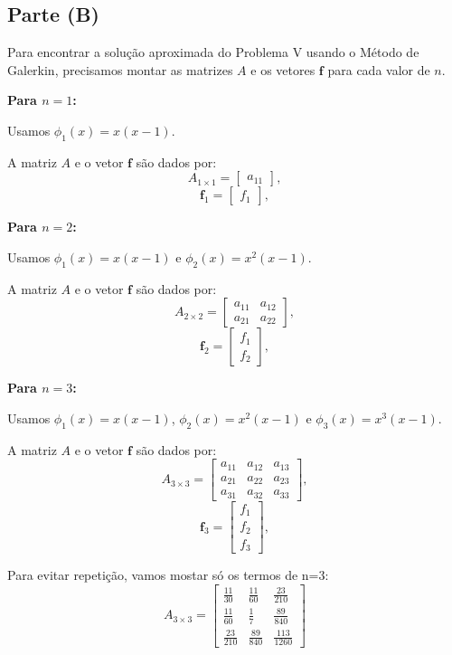 \documentclass{article}
\begin{document}
\subsection{Parte (B)}
Para encontrar a solução aproximada do Problema V usando o Método de Galerkin, precisamos montar as matrizes \( A \) e os vetores \( \mathbf{f} \) para cada valor de \( n \).

\textbf{Para \( n = 1 \):}

Usamos \( \phi_1(x) = x (x - 1) \).

A matriz \( A \) e o vetor \( \mathbf{f} \) são dados por:
\[
A_{1 \times 1} = \begin{bmatrix}
a_{11}
\end{bmatrix},
\]
\[
\mathbf{f}_{1} = \begin{bmatrix}
f_1
\end{bmatrix},
\]


\textbf{Para \( n = 2 \):}

Usamos \( \phi_1(x) = x (x - 1) \) e \( \phi_2(x) = x^2 (x - 1) \).

A matriz \( A \) e o vetor \( \mathbf{f} \) são dados por:
\[
A_{2 \times 2} = \begin{bmatrix}
a_{11} & a_{12} \\
a_{21} & a_{22}
\end{bmatrix},
\]
\[
\mathbf{f}_{2} = \begin{bmatrix}
f_1 \\
f_2
\end{bmatrix},
\]


\textbf{Para \( n = 3 \):}

Usamos \( \phi_1(x) = x (x - 1) \), \( \phi_2(x) = x^2 (x - 1) \) e \( \phi_3(x) = x^3 (x - 1) \).

A matriz \( A \) e o vetor \( \mathbf{f} \) são dados por:
\[
A_{3 \times 3} = \begin{bmatrix}
a_{11} & a_{12} & a_{13} \\
a_{21} & a_{22} & a_{23} \\
a_{31} & a_{32} & a_{33}
\end{bmatrix},
\]
\[
\mathbf{f}_{3} = \begin{bmatrix}
f_1 \\
f_2 \\
f_3
\end{bmatrix},
\]

Para evitar repetição, vamos mostar só os termos de n=3:
\[
A_{3 \times 3} = \begin{bmatrix}
    \frac{11}{30} & \frac{11}{60} & \frac{23}{210} \\
    \frac{11}{60} & \frac{1}{7} & \frac{89}{840} \\
    \frac{23}{210} & \frac{89}{840} & \frac{113}{1260}
    \end{bmatrix}
\]
\end{document}
